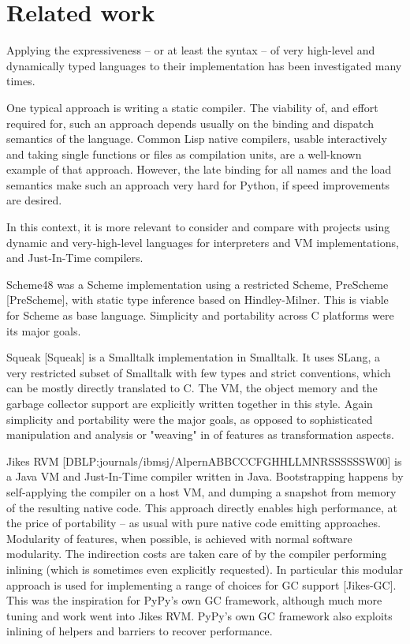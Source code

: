 \documentclass{acm_proc_article-sp}
\begin{document}
\section{Related work}
\label{relatedwork}


Applying the expressiveness -- or at least the syntax -- of very
high-level and dynamically typed languages to their implementation has
been investigated many times.

One typical approach is writing a static compiler.  The viability of,
and effort required for, such an approach depends usually on the binding
and dispatch semantics of the language.  Common Lisp native compilers,
usable interactively and taking single functions or files as compilation
units, are a well-known example of that approach.  However, the late
binding for all names and the load semantics make such an approach very
hard for Python, if speed improvements are desired.

In this context, it is more relevant to consider and compare with
projects using dynamic and very-high-level languages for interpreters
and VM implementations, and Just-In-Time compilers.

Scheme48 was a Scheme implementation using a restricted Scheme, PreScheme
[PreScheme], with static type inference based on Hindley-Milner.  This is
viable for Scheme as base language.  Simplicity and portability across C
platforms were its major goals.

Squeak [Squeak] is a Smalltalk implementation in Smalltalk. It uses SLang, a
very restricted subset of Smalltalk with few types and strict
conventions, which can be mostly directly translated to C.
The VM, the object memory and the garbage collector support are
explicitly written together in this style. Again simplicity and
portability were the major goals, as opposed to sophisticated manipulation
and analysis or "weaving" in of features as transformation aspects.

Jikes RVM [DBLP:journals/ibmsj/AlpernABBCCCFGHHLLMNRSSSSSSW00] is a
Java VM and Just-In-Time compiler written in Java.
Bootstrapping happens by self-applying the compiler on a host VM, and
dumping a snapshot from memory of the resulting native code.
This approach directly enables high performance, at the price of
portability -- as usual with pure native code emitting
approaches. Modularity of features, when possible, is achieved with
normal software modularity. The indirection costs are taken care of by
the compiler performing inlining (which is sometimes even explicitly
requested).  In particular this modular approach is used
for implementing a range of choices for GC support [Jikes-GC].  This was
the inspiration for PyPy's own GC framework, although much more tuning
and work went into Jikes RVM.  PyPy's own GC framework also exploits
inlining of helpers and barriers to recover performance.
\end{document}
